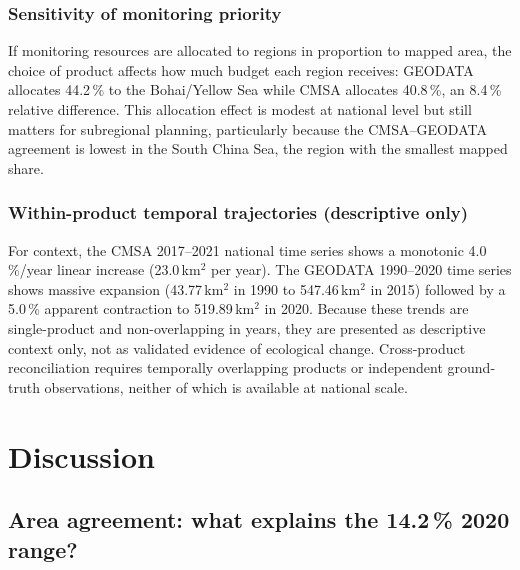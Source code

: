 \documentclass[11pt]{article}
\begin{document}
\subsubsection{Sensitivity of monitoring priority}

If monitoring resources are allocated to regions in proportion to mapped
area, the choice of product affects how much budget each region receives:
GEODATA allocates 44.2\,\% to the Bohai/Yellow Sea while CMSA allocates
40.8\,\%, an 8.4\,\% relative difference. This allocation effect is modest
at national level but still matters for subregional
planning, particularly because the CMSA--GEODATA agreement is lowest in the
South China Sea, the region with the smallest mapped share.

\subsubsection{Within-product temporal trajectories (descriptive only)}

For context, the CMSA 2017--2021 national time series shows a monotonic
4.0\,\%/year linear increase (23.0\,km$^2$ per year). The
GEODATA 1990--2020 time series shows massive expansion (43.77\,km$^2$ in 1990
to 547.46\,km$^2$ in 2015) followed by a 5.0\,\% apparent contraction to
519.89\,km$^2$ in 2020. Because these trends are single-product and
non-overlapping in years, they are presented as descriptive context only, not
as validated evidence of ecological change. Cross-product reconciliation
requires temporally overlapping products or independent ground-truth
observations, neither of which is available at national scale.

\section{Discussion}
\label{sec:discussion}

\subsection{Area agreement: what explains the 14.2\,\% 2020 range?}
\end{document}
